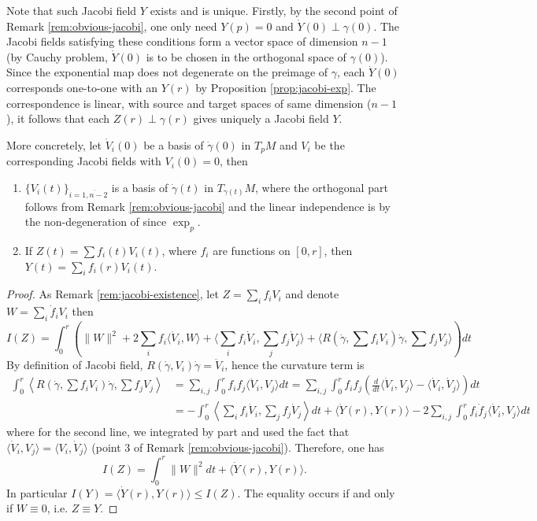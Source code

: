 \documentclass[11pt]{article}
\begin{document}
\begin{remark}
\label{rem:jacobi-existence}
Note that such Jacobi field \(Y\) exists and is unique. Firstly, by the second point of Remark
\ref{rem:obvious-jacobi}, one only need \(Y(p) =0\) and \(\dot Y(0) \perp\gamma(0)\). The Jacobi fields satisfying these conditions form a vector space of dimension \(n-1\) (by Cauchy problem, \(\dot Y(0)\) is to be chosen in the orthogonal
space of \(\gamma(0)\)). Since the exponential map does not degenerate on the preimage
of \(\gamma\), each \(\dot Y(0)\) corresponds one-to-one with an \(Y(r)\) by
Proposition \ref{prop:jacobi-exp}. The correspondence is linear, with source and
target spaces of same dimension (\(n-1\)), it follows that each \(Z(r)\perp \gamma(r)\) gives uniquely a Jacobi field \(Y\).

More concretely, let \(\dot V_i(0)\) be a basis of \(\dot\gamma(0)\) in \(T_pM\) and
\(V_i\) be the corresponding Jacobi fields with \(V_i(0)=0\), then
\begin{enumerate}
\item \(\{V_i(t)\}_{i=\overline{1,n-2}}\) is a basis of \(\dot\gamma(t)\) in \(T_{\gamma(t)}M\), where the orthogonal part follows from Remark \ref{rem:obvious-jacobi}
and the linear independence is by the non-degeneration of since \(\exp_p\).
\item If \(Z(t) = \sum f_i(t)V_i(t)\), where \(f_i\) are functions on \([0,r]\), then \(Y(t) = \sum_i f_i(r)V_i(t)\).
\end{enumerate}
\end{remark}

\begin{proof}
As Remark \ref{rem:jacobi-existence}, let \(Z = \sum_i f_i V_i\) and denote \(W = \sum_i
\dot f_i V_i\) then
\[
 I(Z) = \int_0^r\left( \|W\|^2 + 2 \sum_i f_i \langle \dot V_i, W \rangle + \langle \sum_i
f_i\dot V_i,\sum_j f_j\dot V_j \rangle + \langle R(\dot\gamma,\sum f_i V_i)\dot\gamma,\sum
f_j V_j \rangle\right)dt
\]
By definition of Jacobi field, \(R(\dot\gamma, V_i)\dot\gamma = \ddot V_i\), hence the
curvature term is
\begin{equation*}
\begin{split}
\int_0^r \left\langle R(\dot\gamma,\sum f_i V_i)\dot\gamma,\sum f_j V_j \right\rangle &=\sum_{i,j}\int _0^r f_i f_j \langle \ddot V_i, V_j \rangle dt =\sum_{i,j}\int_0^r f_if_j \left(\frac{d }{dt} \langle \dot V_i, V_j \rangle - \langle \dot V_i,\dot V_j \rangle\right)dt\\
			 	       &= -\int_0^r \left\langle \sum_i f_i \dot V_i,\sum_j f_j \dot V_j \right\rangle dt + \langle \dot Y(r), Y(r) \rangle - 2\sum_{i,j}\int_0^r f_i\dot f_j \langle \dot V_i,V_j \rangle dt
\end{split}   
\end{equation*}
where for the second line, we integrated by part and used the fact that
\(\langle \dot V_i, V_j \rangle = \langle V_i, \dot V_j \rangle\) (point 3 of Remark
\ref{rem:obvious-jacobi}). Therefore, one has
\[
 I(Z) = \int_0^r \|W\|^2dt + \langle \dot Y(r), Y(r) \rangle.
\]
In particular \(I(Y) = \langle \dot Y(r), Y(r) \rangle \leq I(Z)\). The equality occurs
if and only if \(W\equiv 0\), i.e. \(Z\equiv Y\).
\end{proof}
\end{document}
